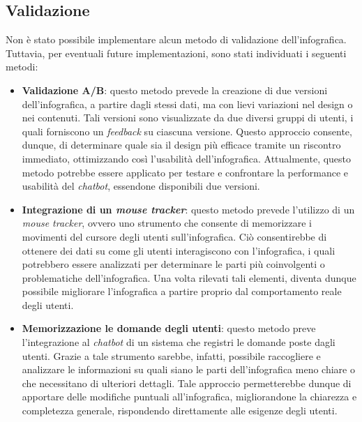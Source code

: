 \subsection{Validazione}
Non è stato possibile implementare alcun metodo di validazione dell'infografica. Tuttavia, per eventuali future implementazioni, sono stati individuati i seguenti metodi:
\begin{itemize}
    \item \textbf{Validazione A/B}: questo metodo prevede la creazione di due versioni dell'infografica, a partire dagli stessi dati, ma con lievi variazioni nel design o nei contenuti.
    Tali versioni sono visualizzate da due diversi gruppi di utenti, i quali forniscono un \emph{feedback} su ciascuna versione. 
    Questo approccio consente, dunque, di determinare quale sia il design più efficace tramite un riscontro immediato, ottimizzando così l'usabilità dell'infografica. 
    Attualmente, questo metodo potrebbe essere applicato per testare e confrontare la performance e usabilità del \emph{chatbot}, essendone disponibili due versioni.
    \item \textbf{Integrazione di un \emph{mouse tracker}}: questo metodo prevede l'utilizzo di un \emph{mouse tracker}, ovvero uno strumento che consente di memorizzare i movimenti del cursore degli utenti 
    sull'infografica. Ciò consentirebbe di ottenere dei dati su come gli utenti interagiscono con l'infografica, i quali potrebbero essere analizzati per determinare le parti più coinvolgenti o problematiche dell'infografica. 
    Una volta rilevati tali elementi, diventa dunque possibile migliorare l'infografica a partire proprio dal comportamento reale degli utenti.
    \item \textbf{Memorizzazione le domande degli utenti}: questo metodo preve l'integrazione al \emph{chatbot} di un sistema che registri le domande poste dagli utenti.
    Grazie a tale strumento sarebbe, infatti, possibile raccogliere e analizzare le informazioni su quali siano le parti dell'infografica meno chiare o che necessitano di ulteriori dettagli. 
    Tale approccio permetterebbe dunque di apportare delle modifiche puntuali all'infografica, migliorandone la chiarezza e completezza generale, rispondendo direttamente alle esigenze degli utenti.
\end{itemize}

